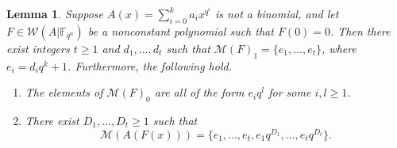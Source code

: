 \documentclass[11pt]{amsart}
\newcommand{\m}{\mathcal M}
\newcommand{\F}{\mathbb{F}}
\newtheorem{lemma}[theorem]{Lemma}
\theoremstyle{definition}
\theoremstyle{remark}
\begin{document}
\begin{lemma}\label{lem:main}
Suppose  $A(x)=\sum_{i=0}^ka_ix^{q^{i}}$ is not a binomial, and let  $F\in \mathcal W(A|\F_{q^n})$ be a nonconstant polynomial such that $F(0)=0$. Then there exist integers $t\ge 1$ and $d_1, \ldots, d_t$ such that $\m(F)_1=\{e_1, \ldots, e_t\}$, where $e_i=d_iq^k+1$. Furthermore, the following hold.

\begin{enumerate}[\rm(i)]
\item The elements of $\m(F)_0$ are all of the form $e_iq^l$ for some $i,l\ge 1$.
\item There exist   $D_1,\ldots,D_t\geq 1$  such that $$\m(A(F(x))) =\{e_1, \ldots, e_t, e_1q^{D_1}, \ldots, e_tq^{D_t}\}.$$
\end{enumerate}
\end{lemma}
\end{document}
